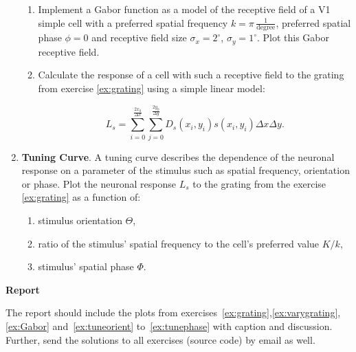 \documentclass[12pt, a4]{article}
\begin{document}
\begin{enumerate}
        \begin{enumerate}
            \item\label{ex:Gabor} Implement a Gabor function as a model of the
                receptive field of a V1 simple cell with a preferred
                spatial frequency $k=\pi\,\frac{1}{\mathrm{degree}}$,
                preferred spatial phase $\phi=0$
                and receptive field size $\sigma_x=2^\circ$,
                $\sigma_y=1^\circ$. Plot this Gabor receptive field.
            \item Calculate the response of a cell with such a
                receptive field to the grating from exercise
                \ref{ex:grating} using a simple linear model:

                \begin{equation}
                    L_s = \sum_{i=0}^{\frac{2x_0}{\Delta x}}
                    \sum_{j=0}^{\frac{2y_0}{\Delta y}} D_s(x_i,y_i) s(x_i,y_i)
                    \Delta x \Delta y.
                    \label{eq:respons}
                \end{equation}
        \end{enumerate}

    \item \textbf{Tuning Curve}. A tuning curve describes the dependence of
        the neuronal response on a parameter of the stimulus such as
        spatial frequency, orientation or phase. Plot the neuronal
        response $L_s$ to the grating from the exercise \ref{ex:grating} as a 
        function of:

        \begin{enumerate}
            \item\label{ex:tuneorient} stimulus orientation $\Theta$,
            \item ratio of the stimulus' spatial frequency to the
                cell's preferred value $K/k$,
            \item\label{ex:tunephase} stimulus' spatial phase  $\Phi$.
        \end{enumerate}

\end{enumerate}

\vspace{1cm}

{\bf Report}

The report should include the plots from
exercises~\ref{ex:grating},\ref{ex:varygrating},\ref{ex:Gabor}
and~\ref{ex:tuneorient} to~\ref{ex:tunephase} with caption and discussion.
Further, send the solutions to all exercises (source code) by email as well.
\end{document}
